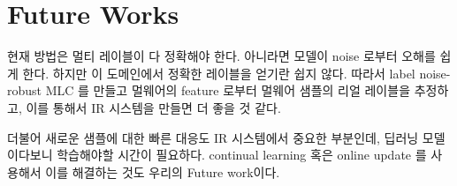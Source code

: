 \section{Future Works}

현재 방법은 멀티 레이블이 다 정확해야 한다. 아니라면 모델이 noise 로부터 오해를 쉽게 한다. 하지만 이 도메인에서 정확한 레이블을 얻기란 쉽지 않다. 따라서 label noise-robust MLC 를 만들고 멀웨어의 feature 로부터 멀웨어 샘플의 리얼 레이블을 추정하고, 이를 통해서 IR 시스템을 만들면 더 좋을 것 같다.

더불어 새로운 샘플에 대한 빠른 대응도 IR 시스템에서 중요한 부분인데, 딥러닝 모델이다보니 학습해야할 시간이 필요하다. continual learning 혹은 online update 를 사용해서 이를 해결하는 것도 우리의 Future work이다. 




